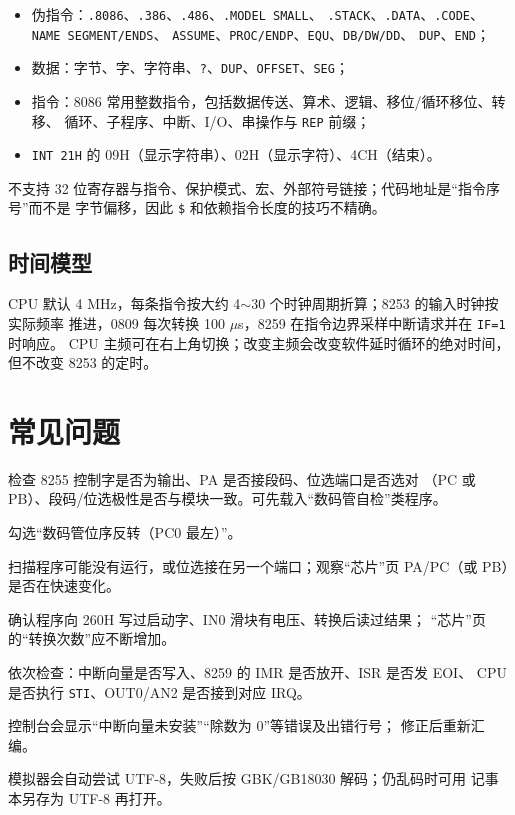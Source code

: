 \documentclass[11pt,a4paper]{ctexart}
\begin{document}
\begin{itemize}
  \item 伪指令：\texttt{.8086}、\texttt{.386}、\texttt{.486}、\texttt{.MODEL SMALL}、
        \texttt{.STACK}、\texttt{.DATA}、\texttt{.CODE}、\texttt{NAME SEGMENT/ENDS}、
        \texttt{ASSUME}、\texttt{PROC/ENDP}、\texttt{EQU}、\texttt{DB/DW/DD}、
        \texttt{DUP}、\texttt{END}；
  \item 数据：字节、字、字符串、\texttt{?}、\texttt{DUP}、\texttt{OFFSET}、\texttt{SEG}；
  \item 指令：8086 常用整数指令，包括数据传送、算术、逻辑、移位/循环移位、转移、
        循环、子程序、中断、I/O、串操作与 \texttt{REP} 前缀；
  \item \texttt{INT 21H} 的 09H（显示字符串）、02H（显示字符）、4CH（结束）。
\end{itemize}

不支持 32 位寄存器与指令、保护模式、宏、外部符号链接；代码地址是“指令序号”而不是
字节偏移，因此 \texttt{\$} 和依赖指令长度的技巧不精确。

\subsection{时间模型}

CPU 默认 4 MHz，每条指令按大约 4$\sim$30 个时钟周期折算；8253 的输入时钟按实际频率
推进，0809 每次转换 100 $\mu$s，8259 在指令边界采样中断请求并在 \texttt{IF=1} 时响应。
CPU 主频可在右上角切换；改变主频会改变软件延时循环的绝对时间，但不改变 8253 的定时。

\section{常见问题}

\begin{description}[leftmargin=2.2em]
  \item[数码管全灭] 检查 8255 控制字是否为输出、PA 是否接段码、位选端口是否选对
        （PC 或 PB）、段码/位选极性是否与模块一致。可先载入“数码管自检”类程序。
  \item[显示左右颠倒] 勾选“数码管位序反转（PC0 最左）”。
  \item[只亮一位或不亮] 扫描程序可能没有运行，或位选接在另一个端口；观察“芯片”页
        PA/PC（或 PB）是否在快速变化。
  \item[ADC 数值不变] 确认程序向 260H 写过启动字、IN0 滑块有电压、转换后读过结果；
        “芯片”页的“转换次数”应不断增加。
  \item[不进中断] 依次检查：中断向量是否写入、8259 的 IMR 是否放开、ISR 是否发 EOI、
        CPU 是否执行 \texttt{STI}、OUT0/AN2 是否接到对应 IRQ。
  \item[程序跑飞] 控制台会显示“中断向量未安装”“除数为 0”等错误及出错行号；
        修正后重新汇编。
  \item[打开乱码] 模拟器会自动尝试 UTF-8，失败后按 GBK/GB18030 解码；仍乱码时可用
        记事本另存为 UTF-8 再打开。
\end{description}
\end{document}

